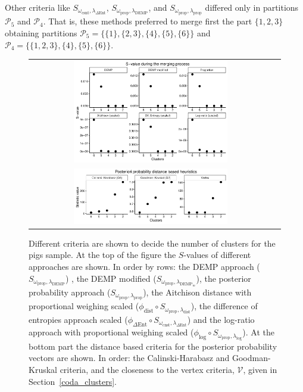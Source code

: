 \documentclass[submit]{smj}
\theoremstyle{definition}
\begin{document}
Other criteria like $S_{\omega_{\text{csnt}},\lambda_{\Delta\text{Ent}}}$,  $S_{\omega_{\text{prop}},\lambda_{\text{DEMP}}}$,  and $S_{\omega_{\text{prop}},\lambda_{\text{prop}}}$ differed only in partitions $\mathcal{P}_5$ and $\mathcal{P}_4$.  That is, these methods preferred to merge first the part $\{1,2,3\}$ obtaining partitions $\mathcal{P}_5 = \{\{1\},\{2, 3\},\{4\},\{5\} ,\{6\}\}$ and $\mathcal{P}_4 = \{\{1,2,3\},\{4\},\{5\},\{6\}\}$.

\begin{figure}[thpb]
\begin{center}
\begin{tabular}{cc}
  \includegraphics[width=0.65\textwidth]{figures/multinomial_Svalues_all.pdf} \\
  \includegraphics[width=0.65\textwidth]{figures/multinomial_statistics.pdf} 
 \end{tabular}
\caption{Different criteria are shown to decide the number of clusters for the pigs sample. At the top of the figure the $S$-values of different approaches are shown. In order by rows: the DEMP approach \citep{hennig2010methods} ($S_{\omega_{\text{prop}}, \lambda_{\text{DEMP}}}$) , the DEMP modified \citep{longford2014} ($S_{\omega_{\text{prop}}, \lambda_{\text{DEMP}_m}}$), the posterior probability approach ($S_{\omega_{\text{prop}}, \lambda_{\text{prop}}}$), the Aitchison distance with proportional weighing scaled ($\phi_{\text{dist}} \circ S_{\omega_\text{prop}, \lambda_{\text{dist}}}$), the difference of entropies approach scaled ($\phi_{\Delta\text{Ent}} \circ S_{\omega_{\text{cnst}}, \lambda_{\Delta\text{Ent}}}$) and the log-ratio approach with proportional weighing scaled ($\phi_{\log} \circ S_{\omega_{\text{prop}}, \lambda_{\log}}$). At the bottom part the distance based criteria for the posterior probability vectors are shown. In order: the Calinski-Harabasz and Goodman-Kruskal criteria, and the closeness to the vertex criteria, $\mathcal{V}$, given in Section~\ref{coda_clusters}.}\label{multinomial_statistics}
\end{center}
\end{figure}
\end{document}
